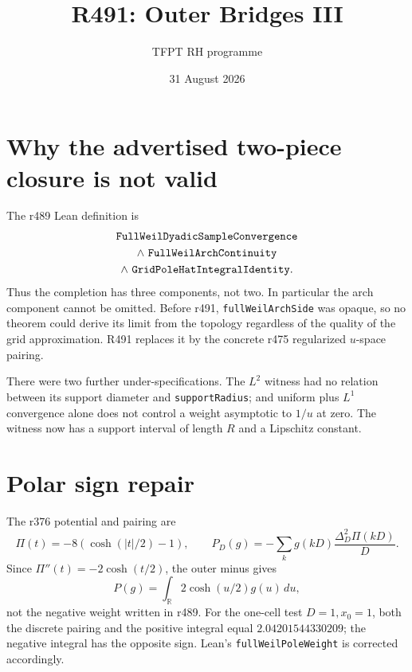 \documentclass[11pt]{article}
\title{R491: Outer Bridges III}
\author{TFPT RH programme}
\date{31 August 2026}
\newcommand{\code}[1]{\nolinkurl{#1}}
\begin{document}
\maketitle

\begin{center}
\end{center}

\section{Why the advertised two-piece closure is not valid}

The r489 Lean definition is
\[
\begin{gathered}
\text{\ttfamily FullWeilDyadicSampleConvergence}\\
\wedge\ \text{\ttfamily FullWeilArchContinuity}\\
\wedge\ \text{\ttfamily GridPoleHatIntegralIdentity}.
\end{gathered}
\]
Thus the completion has three components, not two.  In particular the
arch component cannot be omitted.  Before r491,
\code{fullWeilArchSide} was opaque, so no theorem could derive its
limit from the topology regardless of the quality of the grid
approximation.  R491 replaces it by the concrete r475 regularized
\(u\)-space pairing.

There were two further under-specifications.  The \(L^2\) witness had
no relation between its support diameter and
\code{supportRadius}; and uniform plus \(L^1\) convergence alone does
not control a weight asymptotic to \(1/u\) at zero.  The witness now
has a support interval of length \(R\) and a Lipschitz constant.

\section{Polar sign repair}

The r376 potential and pairing are
\[
\Pi(t)=-8(\cosh(|t|/2)-1),\qquad
P_D(g)=-\sum_k g(kD)\frac{\Delta_D^2\Pi(kD)}D .
\]
Since \(\Pi''(t)=-2\cosh(t/2)\), the outer minus gives
\[
P(g)=\int_{\mathbb R} 2\cosh(u/2)g(u)\,du ,
\]
not the negative weight written in r489.  For the one-cell test
\(D=1,x_0=1\), both the discrete pairing and the positive integral
equal \(2.04201544330209\); the negative integral has the opposite
sign.  Lean's \code{fullWeilPoleWeight} is corrected accordingly.
\end{document}
